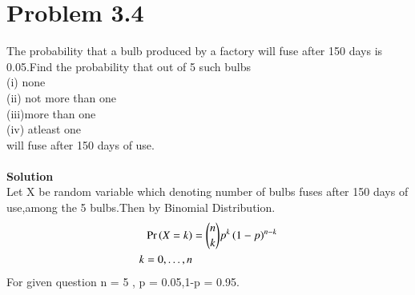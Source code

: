 \documentclass[journal,12pt,twocolumn]{IEEEtran}
\begin{document}
\section{Problem 3.4}
The probability that a bulb produced by a factory will fuse after 150 days is 0.05.Find the probability that out of 5 such bulbs\\ (i) none \\(ii) not more than one\\(iii)more than one\\(iv) atleast one\\ will fuse after 150 days of use.\\\\
\textbf{Solution}\\
Let X be random variable which denoting number of bulbs fuses after 150 days of use,among the 5 bulbs.Then by Binomial Distribution.
\begin{align}
    \Pr\left(X=k\right)&=\binom{n}{k} p^k\left(1-p\right)^{n-k}
    \\
    k=0,\dots,n
    \label{eq:exam41_1}
\end{align}
For given question n = 5 , p = 0.05,1-p = 0.95.
\end{document}
